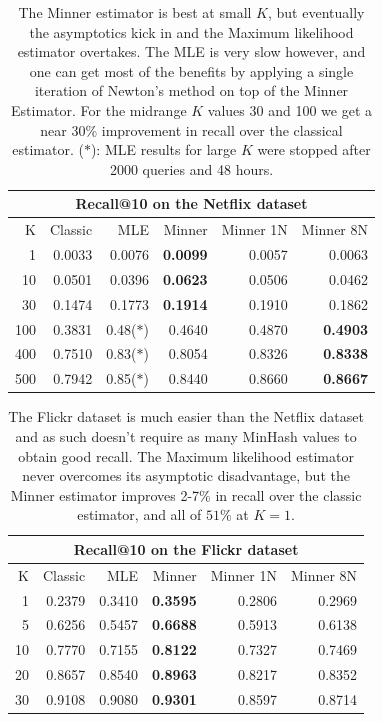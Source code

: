 \begin{table}
\centering
 \begin{tabular}{|r| r r r r r|} 
 \hline
     \multicolumn{6}{|c|}{Recall@10 on the Netflix dataset} \\
 \hline
 K  & Classic & MLE & Minner & Minner 1N & Minner 8N \\
 \hline
    1 & 0.0033 & 0.0076 & \textbf{ 0.0099} & 0.0057 & 0.0063 \\
  10 & 0.0501 & 0.0396 & \textbf{ 0.0623} & 0.0506 & 0.0462 \\
  30 & 0.1474 & 0.1773 & \textbf{ 0.1914} & 0.1910 & 0.1862 \\
  100 & 0.3831 & 0.48($\ast$)
  & 0.4640 & 0.4870 & \textbf{ 0.4903} \\
  400 & 0.7510 & 0.83($\ast$) & 0.8054 & 0.8326 & \textbf{ 0.8338} \\
  500 & 0.7942 & 0.85($\ast$) & 0.8440 & 0.8660 & \textbf{ 0.8667} \\
  \hline
 \end{tabular}
 \caption{The Minner estimator is best at small $K$, but eventually the asymptotics kick in and the Maximum likelihood estimator overtakes. The MLE is very slow however, and one can get most of the benefits by applying a single iteration of Newton's method on top of the Minner Estimator.
    For the midrange $K$ values 30 and 100 we get a near 30\% improvement in recall over the classical estimator.
   ($\ast$): MLE results for large $K$ were stopped after 2000 queries and 48 hours.
 }
 \label{tab:netflix}
\end{table}

\begin{table}
\centering
 \begin{tabular}{|r| r r r r r|} 
 \hline
     \multicolumn{6}{|c|}{Recall@10 on the Flickr dataset} \\
 \hline
 K  & Classic & MLE & Minner & Minner 1N & Minner 8N \\
 \hline
    1 & 0.2379 & 0.3410 & \textbf{ 0.3595} & 0.2806 & 0.2969 \\
   5 & 0.6256 & 0.5457 & \textbf{ 0.6688} & 0.5913 & 0.6138 \\
  10 & 0.7770 & 0.7155 & \textbf{ 0.8122} & 0.7327 & 0.7469 \\
  20 & 0.8657 & 0.8540 & \textbf{ 0.8963} & 0.8217 & 0.8352 \\
  30 & 0.9108 & 0.9080 & \textbf{ 0.9301} & 0.8597 & 0.8714 \\
  \hline
 \end{tabular}
 \caption{The Flickr dataset is much easier than the Netflix dataset and as such doesn't require as many MinHash values to obtain good recall. The Maximum likelihood estimator never overcomes its asymptotic disadvantage, but the Minner estimator improves 2-7\% in recall over the classic estimator, and all of $51\%$ at $K=1$.}
 \label{tab:flickr}
\end{table}


